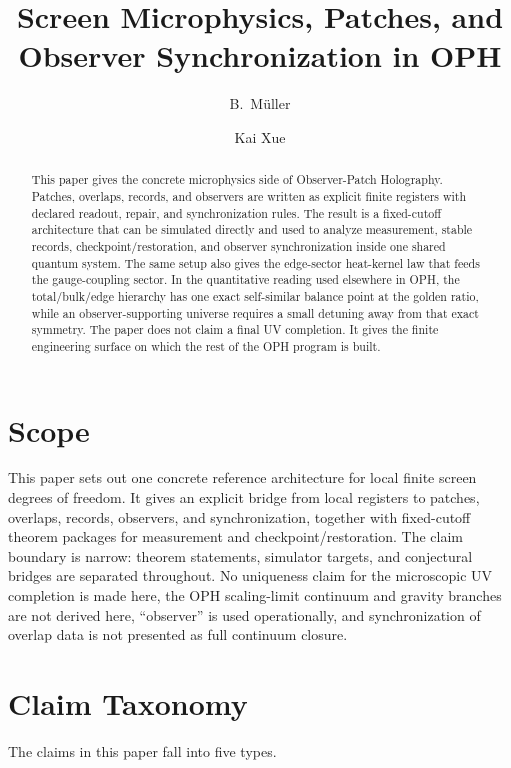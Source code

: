 \documentclass[11pt]{article}
\title{Screen Microphysics, Patches, and Observer Synchronization in OPH}
\author{B.\ M\"uller \and Kai Xue}
\date{\OPHPaperReleaseDate}
\begin{document}
\maketitle
\OPHPaperReleaseBanner

\begin{abstract}
This paper gives the concrete microphysics side of Observer-Patch Holography. Patches, overlaps, records, and observers are written as explicit finite registers with declared readout, repair, and synchronization rules. The result is a fixed-cutoff architecture that can be simulated directly and used to analyze measurement, stable records, checkpoint/restoration, and observer synchronization inside one shared quantum system. The same setup also gives the edge-sector heat-kernel law that feeds the gauge-coupling sector. In the quantitative reading used elsewhere in OPH, the total/bulk/edge hierarchy has one exact self-similar balance point at the golden ratio, while an observer-supporting universe requires a small detuning away from that exact symmetry. The paper does not claim a final UV completion. It gives the finite engineering surface on which the rest of the OPH program is built.
\end{abstract}

\tableofcontents
\newpage

\section{Scope}

This paper sets out one concrete reference architecture for local finite screen degrees of
freedom. It gives an explicit bridge from local registers to patches, overlaps, records,
observers, and synchronization, together with fixed-cutoff theorem packages for measurement and
checkpoint/restoration. The claim boundary is narrow: theorem statements, simulator targets, and
conjectural bridges are separated throughout. No uniqueness claim for the microscopic UV
completion is made here, the OPH scaling-limit continuum and gravity branches are not derived
here, ``observer'' is used operationally, and synchronization of overlap data is not presented as
full continuum closure.

\section{Claim Taxonomy}

The claims in this paper fall into five types.
\end{document}
